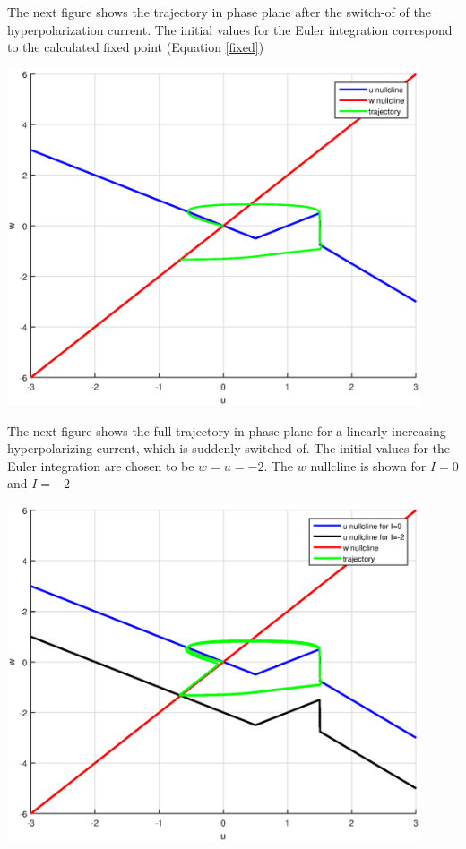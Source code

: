 \documentclass[12pt]{article}
\newenvironment{exercise}[2][Exercise]{\begin{trivlist}
\item[\hskip \labelsep {\bfseries #1}\hskip \labelsep {\bfseries #2.}]}{\end{trivlist}}
\begin{document}
\begin{exercise}{3.2}
\begin{enumerate}
The next figure shows the trajectory in phase plane after the switch-of of the hyperpolarization current. The initial values for the Euler integration correspond to the calculated fixed point (Equation \ref{fixed})

\includegraphics[width=4.8in]{excercise32c_part}

The next figure shows the full trajectory in phase plane for a linearly increasing hyperpolarizing current, which is suddenly switched of. The initial values for the Euler integration are chosen to be $w=u=-2$. The $w$ nullcline is shown for $I=0$ and $I=-2$

\includegraphics[width=4.8in]{excercise32c_full}
\end{enumerate}

\end{exercise}
\end{document}
